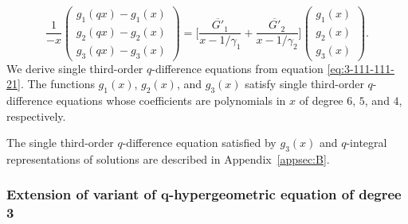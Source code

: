 \documentclass[pdftex]{sigma}
\numberwithin{equation}{section}
\theoremstyle{definition}
\begin{document}
\begin{equation} \label{eq:3-111-111-21}
\frac{1}{-x}
\begin{pmatrix}
 g_1(qx) - g_1(x) \\
 g_2(qx) - g_2(x) \\
 g_3(qx) - g_3(x)
\end{pmatrix}
= \bigg[ \frac{\overline{G'}_1}{x-1/\gamma_1} + \frac{\overline{G'}_2}{x-1/\gamma_2} \bigg]
 \begin{pmatrix}
 g_1(x) \\
 g_2(x) \\
 g_3(x)
 \end{pmatrix}.
\end{equation}
We derive single third-order $q$-difference equations from equation \eqref{eq:3-111-111-21}.
The functions $g_1(x)$, $g_2(x)$, and $g_3(x)$ satisfy single third-order $q$-difference equations whose coefficients are polynomials in $x$ of degree $6$, $5$, and $4$, respectively.

The single third-order $q$-difference equation satisfied by $g_3(x)$ and $q$-integral representations of solutions are described in Appendix~\ref{appsec:B}.

\subsubsection[Extension of variant of q-hypergeometric equation of degree 3]{Extension of variant of $\boldsymbol{q}$-hypergeometric equation of degree 3} \label{subsec:3extedeg3}
\end{document}
